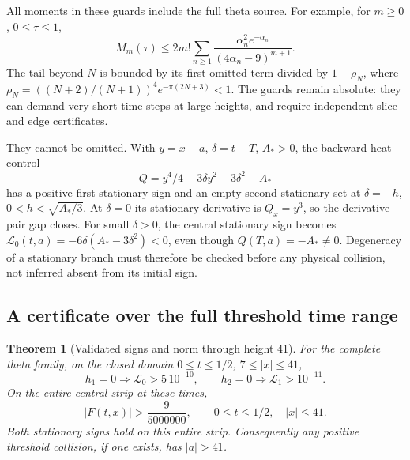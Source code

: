 \documentclass[11pt]{article}
\numberwithin{equation}{section}
\newtheorem{theorem}{Theorem}[section]
\theoremstyle{definition}
\theoremstyle{remark}
\newcommand{\Lag}{\mathscr L}
\begin{document}
All moments in these guards include the full theta source. For example,
for \(m\ge0\), \(0\le\tau\le1\),
\[
 M_m(\tau)\le2m!\sum_{n\ge1}
 \frac{\alpha_n^2e^{-\alpha_n}}{(4\alpha_n-9)^{m+1}}.
\]
The tail beyond \(N\) is bounded by its first omitted term divided by
\(1-\rho_N\), where
\(\rho_N=((N+2)/(N+1))^4e^{-\pi(2N+3)}<1\).
The guards remain absolute: they can demand very short time steps at
large heights, and require independent slice and edge certificates.

They cannot be omitted. With \(y=x-a\), \(\delta=t-T\), \(A_*>0\),
the backward-heat control
\[
 Q=y^4/4-3\delta y^2+3\delta^2-A_*
\]
has a positive first stationary sign and an empty second stationary set
at \(\delta=-h\), \(0<h<\sqrt{A_*/3}\). At \(\delta=0\) its
stationary derivative is \(Q_x=y^3\), so the derivative-pair gap closes.
For small \(\delta>0\), the central stationary sign becomes
\(\Lag_0(t,a)=-6\delta(A_*-3\delta^2)<0\), even though
\(Q(T,a)=-A_*\ne0\). Degeneracy of a stationary branch must therefore
be checked before any physical collision, not inferred absent from its
initial sign.


\subsection{A certificate over the full threshold time range}
\label{sec:full-time-certificate}

\begin{theorem}[Validated signs and norm through height 41]
\label{thm:full-time-height-41}
For the complete theta family, on the closed domain
\(0\le t\le1/2\), \(7\le|x|\le41\),
\begin{equation}
 h_1=0\Longrightarrow\Lag_0>5\,10^{-10},\qquad
 h_2=0\Longrightarrow\Lag_1>10^{-11}.
 \label{eq:full-time-stationary-signs}
\end{equation}
On the entire central strip at these times,
\begin{equation}
 |F(t,x)|>\frac9{5000000},\qquad
 0\le t\le1/2,\quad |x|\le41.
 \label{eq:height-41-norm-gap}
\end{equation}
Both stationary signs hold on this entire strip. Consequently any
positive threshold collision, if one exists, has \(|a|>41\).
\end{theorem}
\end{document}
